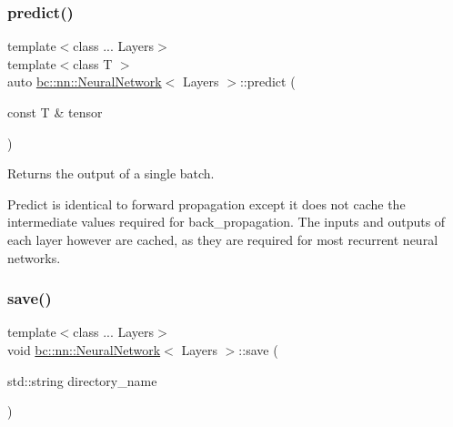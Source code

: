 \mbox{\label{structbc_1_1nn_1_1NeuralNetwork_a3781d20ddd5273b475bbe5abb5fc938d}} 
\subsubsection{\texorpdfstring{predict()}{predict()}}
{\footnotesize\ttfamily template$<$class ... Layers$>$ \\
template$<$class T $>$ \\
auto \hyperlink{structbc_1_1nn_1_1NeuralNetwork}{bc\+::nn\+::\+Neural\+Network}$<$ Layers $>$\+::predict (\begin{DoxyParamCaption}\item[{const T \&}]{tensor }\end{DoxyParamCaption})\hspace{0.3cm}{\ttfamily [inline]}}



Returns the output of a single batch. 

Predict is identical to forward propagation except it does not cache the intermediate values required for back\+\_\+propagation. The inputs and outputs of each layer however are cached, as they are required for most recurrent neural networks. \mbox{\label{structbc_1_1nn_1_1NeuralNetwork_a533a431c81ec66797f2349d52d316aa3}} 
\subsubsection{\texorpdfstring{save()}{save()}}
{\footnotesize\ttfamily template$<$class ... Layers$>$ \\
void \hyperlink{structbc_1_1nn_1_1NeuralNetwork}{bc\+::nn\+::\+Neural\+Network}$<$ Layers $>$\+::save (\begin{DoxyParamCaption}\item[{std\+::string}]{directory\+\_\+name }\end{DoxyParamCaption})\hspace{0.3cm}{\ttfamily [inline]}}



